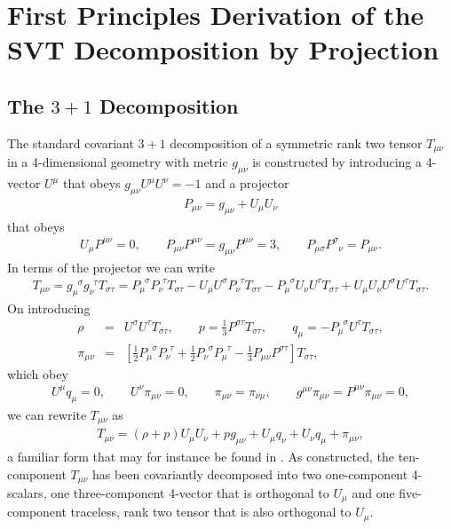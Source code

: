 \documentclass[aps]{revtex4}
\begin{document}
\section{First Principles Derivation of the SVT Decomposition by Projection}
\label{SE}

\subsection{The $3+1$ Decomposition}

The standard covariant $3+1$ decomposition of a symmetric rank two tensor $T_{\mu\nu}$ in a 4-dimensional geometry with metric $g_{\mu\nu}$ is constructed by introducing a 4-vector $U^{\mu}$ that obeys $g_{\mu\nu}U^{\mu}U^{\nu}=-1$ and a projector 
%
\begin{eqnarray}
P_{\mu\nu}=g_{\mu\nu}+U_{\mu}U_{\nu}
\label{E1}
\end{eqnarray}
%
that obeys
%
\begin{eqnarray}
U_{\mu}P^{\mu\nu}=0, \qquad P_{\mu\nu}P^{\mu\nu}=g_{\mu\nu}P^{\mu\nu}=3,\qquad P_{\mu\sigma}P^{\sigma}_{\phantom{\sigma}\nu}=P_{\mu\nu}.
\label{E2}
\end{eqnarray}
%
In terms of the projector we can write
%
\begin{eqnarray}
T_{\mu\nu}=g_{\mu}^{\phantom{\mu}\sigma}g_{\nu}^{\phantom{\nu}\tau}T_{\sigma\tau}=
P_{\mu}^{\phantom{\mu}\sigma}P_{\nu}^{\phantom{\nu}\tau}T_{\sigma\tau}
-U_{\mu}U^{\sigma}P_{\nu}^{\phantom{\nu}\tau}T_{\sigma\tau}
-P_{\mu}^{\phantom{\mu}\sigma}U_{\nu}U^{\tau}T_{\sigma\tau}
+U_{\mu}U_{\nu}U^{\sigma}U^{\tau}T_{\sigma\tau}.
\label{E3}
\end{eqnarray}
%
On introducing
%
\begin{eqnarray}
\rho&=&U^{\sigma}U^{\tau}T_{\sigma\tau},\qquad p=\frac{1}{3}P^{\sigma\tau}T_{\sigma\tau},\qquad 
q_{\mu}=-P_{\mu}^{\phantom{\mu}\sigma}U^{\tau}T_{\sigma\tau},
\nonumber\\
\pi_{\mu\nu}&=&\left[\frac{1}{2}P_{\mu}^{\phantom{\mu}\sigma}P_{\nu}^{\phantom{\nu}\tau}
+\frac{1}{2}P_{\nu}^{\phantom{\nu}\sigma}P_{\mu}^{\phantom{\mu}\tau}
-\frac{1}{3}P_{\mu\nu}P^{\sigma\tau}\right]T_{\sigma\tau},
\label{E4}
\end{eqnarray}
%
which obey
%
\begin{eqnarray}
U^{\mu}q_{\mu}=0,\qquad U^{\nu}\pi_{\mu\nu}=0,\qquad \pi_{\mu\nu}=\pi_{\nu\mu},\qquad g^{\mu\nu}\pi_{\mu\nu}=P^{\mu\nu}\pi_{\mu\nu}=0,
\label{E5}
\end{eqnarray}
%
we can rewrite $T_{\mu\nu}$ as
%
\begin{eqnarray}
T_{\mu\nu}=(\rho+p)U_{\mu}U_{\nu}+pg_{\mu\nu}+U_{\mu}q_{\nu}+U_{\nu}q_{\mu}+\pi_{\mu\nu},
\label{E6}
\end{eqnarray}
%
a familiar form that may for instance be found in \cite{Ellis1971}. As constructed, the ten-component $T_{\mu\nu}$ has been covariantly decomposed into two one-component 4-scalars, one three-component  4-vector that is orthogonal to $U_{\mu}$ and one five-component traceless, rank two tensor that is also orthogonal  to $U_{\mu}$.
\end{document}
